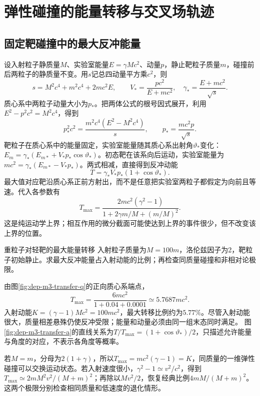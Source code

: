 \section{弹性碰撞的能量转移与交叉场轨迹}
\subsection{固定靶碰撞中的最大反冲能量}
设入射粒子静质量$M$、实验室能量$E=\gamma Mc^2$、动量$p$，静止靶粒子质量$m$，碰撞前后两粒子的静质量不变。用$s$记总四动量平方乘$c^2$，则
\[
 s=M^2c^4+m^2c^4+2mc^2E,
 \qquad V_* =\frac{pc^2}{E+mc^2},\quad
 \gamma_* =\frac{E+mc^2}{\sqrt s}.
\]
质心系中两粒子动量大小为$p_*$。把两体公式的根号因式展开，利用$E^2-p^2c^2=M^2c^4$，得到
\[
 p_*^2c^2=\frac{m^2c^4(E^2-M^2c^4)}s,
 \qquad p_* =\frac{mc^2p}{\sqrt s}.
\]
靶粒子在质心系中的能量固定，实验室能量随其质心系出射角$\vartheta_*$变化：$E_m=\gamma_*(E_{m*}+V_*p_*\cos\vartheta_*)$。初态靶在该系向后运动，实验室能量为$mc^2=\gamma_*(E_{m*}-V_*p_*)$。两式相减，直接得到反冲动能
\[
 T=\gamma_*V_*p_*(1+\cos\vartheta_*).
\]
最大值对应靶沿质心系正前方射出，而不是任意把实验室两粒子都假定为向前且等速。代入各参数有
\[
 T_{\max}=\frac{2m c^2(\gamma^2-1)}
 {1+2\gamma m/M+(m/M)^2}.
\]
这是纯运动学上界；相互作用的微分截面可能使达到上界的事件很少，但不改变该上界的位置。

\begin{example}重粒子对轻靶的最大能量转移
入射粒子质量为$M=100m$，洛伦兹因子为2，靶粒子初始静止。求最大反冲能量占入射动能的比例；再检查同质量碰撞和非相对论极限。
\end{example}
\begin{solution}
由图\ref{fig:dep-m3-transfer-q}的正向质心系端点，
\[
 T_{\max}=\frac{6mc^2}{1+0.04+0.0001}
 \simeq5.7687mc^2.
\]
入射动能$K=(\gamma-1)Mc^2=100mc^2$，最大转移比例约为$5.77\%$。尽管入射动能很大，质量相差悬殊仍使反冲受限；能量和动量必须由同一组末态同时满足。
图\ref{fig:dep-m3-transfer-a}的直线关系为$T/T_{\max}=(1+\cos\vartheta_*)/2$，只描述允许能量与角度的对应，不表示各角度等概率。

若$M=m$，分母为$2(1+\gamma)$，所以$T_{\max}=mc^2(\gamma-1)=K$，同质量的一维弹性碰撞可以交换运动状态。若入射速度很小，$\gamma^2-1\simeq v^2/c^2$，得到$T_{\max}\simeq2mM^2v^2/(M+m)^2$；再除以$Mv^2/2$，恢复经典比例$4mM/(M+m)^2$。这两个极限分别检查相同质量和低速度的退化情形。
\end{solution}

